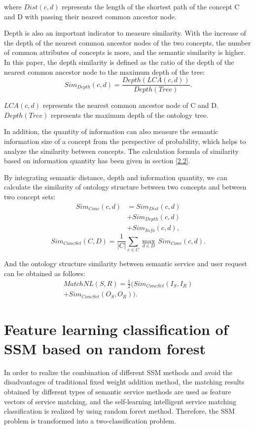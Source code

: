 \documentclass{ieeeaccess}
\begin{document}
where $Dist(c,d)$ represents the length of the shortest path of the concept C and D with passing their nearest common ancestor node.

Depth is also an important indicator to measure similarity. With the increase of the depth of the nearest common ancestor nodes of the two concepts, the number of common attributes of concepts is more, and the semantic similarity is higher. In this paper, the depth similarity is defined as the ratio of the depth of the nearest common ancestor node to the maximum depth of the tree:
\begin{equation}
Sim_{Depth}( c,d )=\frac{Depth( LCA( c,d ) )}{Depth( Tree )}.
\end{equation}

$LCA(c,d)$ represents the nearest common ancestor node of C and D. $Depth(Tree)$ represents the maximum depth of the ontology tree.

In addition, the quantity of information can also measure the semantic information size of a concept from the perspective of probability, which helps to analyze the similarity between concepts. The calculation formula of similarity based on information quantity has been given in section \ref{2.2}.

By integrating semantic distance, depth and information quantity, we can calculate the similarity of ontology structure between two concepts and between two concept sets:
\begin{align}
Si{{m}_{Conc}}\left( c,d \right)&=Si{{m}_{Dist}}\left( c,d \right)\nonumber\\
&+Si{{m}_{Depth}}\left( c,d \right)\nonumber\\
&+Si{{m}_{Info}}\left( c,d \right),
\end{align}
\begin{equation}
Si{{m}_{ConcSet}}\left( C,D \right)=\frac{1}{\left| C \right|}\sum\limits_{c\in C}{\underset{d\in D}{\mathop{\max }}\,Si{{m}_{Conc}}\left( c,d \right)}.
\end{equation}

And the ontology structure similarity between semantic service and user request can be obtained as follows:
\begin{align}
MatchNL(S,R)=\frac{1}{2}( Sim_{ConcSet}( I_{S},I_{R})\nonumber\\
 + Sim_{ConcSet}( O_{S},O_{R}) ).
\end{align}

\section{Feature learning classification of SSM based on random forest}
In order to realize the combination of different SSM methods and avoid the disadvantages of traditional fixed weight addition method, the matching results obtained by different types of semantic service methods are used as feature vectors of service matching, and the self-learning intelligent service matching classification is realized by using random forest method. Therefore, the SSM problem is transformed into a two-classification problem.
\end{document}
